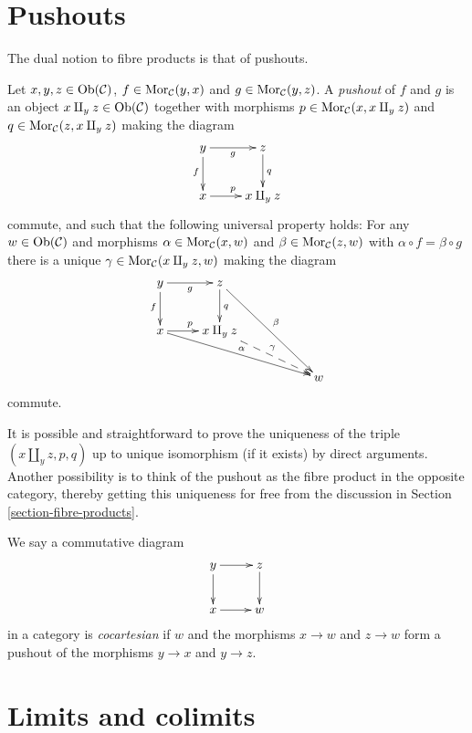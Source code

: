 \section{Pushouts}
\label{section-pushouts}

\noindent
The dual notion to fibre products is that of pushouts.

\begin{definition}
\label{definition-pushouts}
Let $x, y, z\in \mathop{\mathrm{Ob}}\nolimits(\mathcal{C})$,
$f\in \mathop{\mathrm{Mor}}\nolimits_\mathcal{C}(y, x)$
and $g\in \mathop{\mathrm{Mor}}\nolimits_{\mathcal C}(y, z)$.
A {\it pushout} of $f$ and $g$ is
an object $x\amalg_y z\in \mathop{\mathrm{Ob}}\nolimits(\mathcal{C})$
together with morphisms
$p\in \mathop{\mathrm{Mor}}\nolimits_{\mathcal C}(x, x\amalg_y z)$ and
$q\in\mathop{\mathrm{Mor}}\nolimits_{\mathcal C}(z, x\amalg_y z)$ making the diagram
$$
\xymatrix{
y \ar[r]_g \ar[d]_f & z \ar[d]^q \\
x \ar[r]^p & x\amalg_y z
}
$$
commute, and such that the following universal property holds:
For any $w\in \mathop{\mathrm{Ob}}\nolimits(\mathcal{C})$ and morphisms
$\alpha \in \mathop{\mathrm{Mor}}\nolimits_{\mathcal C}(x, w)$ and
$\beta \in \mathop{\mathrm{Mor}}\nolimits_\mathcal{C}(z, w)$ with
$\alpha \circ f = \beta \circ g$ there is a unique
$\gamma\in \mathop{\mathrm{Mor}}\nolimits_{\mathcal C}(x\amalg_y z, w)$ making
the diagram
$$
\xymatrix{
y \ar[r]_g \ar[d]_f & z \ar[d]^q \ar[rrdd]^\beta & & \\
x \ar[r]^p \ar[rrrd]^\alpha & x \amalg_y z \ar@{-->}[rrd]^\gamma & & \\
& & & w
}
$$
commute.
\end{definition}

\noindent
It is possible and straightforward to prove the uniqueness of the triple
$(x\amalg_y z, p, q)$ up to unique isomorphism (if it exists) by direct
arguments. Another possibility is to think of the pushout as the
fibre product in the opposite category, thereby getting this uniqueness for
free from the discussion in Section \ref{section-fibre-products}.

\begin{definition}
\label{definition-cocartesian}
We say a commutative diagram
$$
\xymatrix{
y \ar[r] \ar[d] & z \ar[d] \\
x \ar[r] & w
}
$$
in a category is {\it cocartesian} if $w$ and the morphisms $x \to w$ and
$z \to w$ form a pushout of the morphisms $y \to x$ and $y \to z$.
\end{definition}




\section{Limits and colimits}
\label{section-limits-and-colimits}

